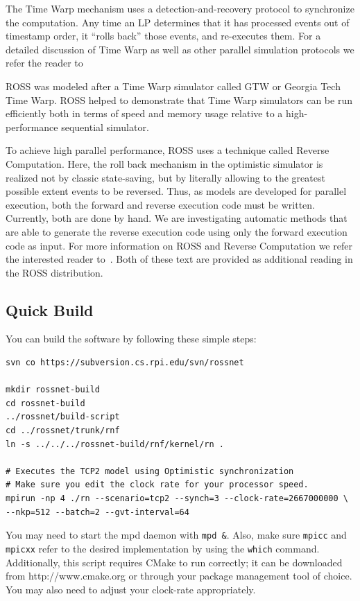 \documentclass[12pt]{article}
\begin{document}
The Time Warp mechanism uses a detection-and-recovery protocol to synchronize
the computation.  Any time an LP determines that it has processed events out
of timestamp order, it ``rolls back'' those events, and re-executes them. For
a detailed discussion of Time Warp as well as other parallel simulation
protocols we refer the reader to~\cite{fujimoto-cacm-1990}

ROSS was modeled after a Time Warp simulator called GTW or Georgia Tech Time
Warp\cite{das-wsc-1994}. ROSS helped to demonstrate that Time Warp simulators
can be run efficiently both in terms of speed and memory usage relative to a
high-performance sequential simulator.

To achieve high parallel performance, ROSS uses a technique called Reverse
Computation. Here, the roll back mechanism in the optimistic simulator is
realized not by classic state-saving, but by literally allowing to the
greatest possible extent events to be reversed. Thus, as models are developed
for parallel execution, both the forward and reverse execution code must be
written. Currently, both are done by hand. We are investigating automatic
methods that are able to generate the reverse execution code using only the
forward execution code as input. For more information on ROSS and Reverse
Computation we refer the interested reader to~\cite{carothers-tomacs-1999,
  carothers-pads-2000}. Both of these text are provided as additional reading
in the ROSS distribution.

\subsection{Quick Build}

You can build the software by following these simple steps:

\begin{verbatim}
svn co https://subversion.cs.rpi.edu/svn/rossnet

mkdir rossnet-build
cd rossnet-build
../rossnet/build-script
cd ../rossnet/trunk/rnf
ln -s ../../../rossnet-build/rnf/kernel/rn .

# Executes the TCP2 model using Optimistic synchronization
# Make sure you edit the clock rate for your processor speed.
mpirun -np 4 ./rn --scenario=tcp2 --synch=3 --clock-rate=2667000000 \
--nkp=512 --batch=2 --gvt-interval=64
\end{verbatim}

You may need to start the mpd daemon with \texttt{mpd \&}.  Also, make sure
\texttt{mpicc} and \texttt{mpicxx} refer to the desired implementation by
using the \texttt{which} command.  Additionally, this script requires CMake to
run correctly; it can be downloaded from http://www.cmake.org or through your
package management tool of choice. You may also need to adjust your clock-rate
appropriately.
\end{document}

